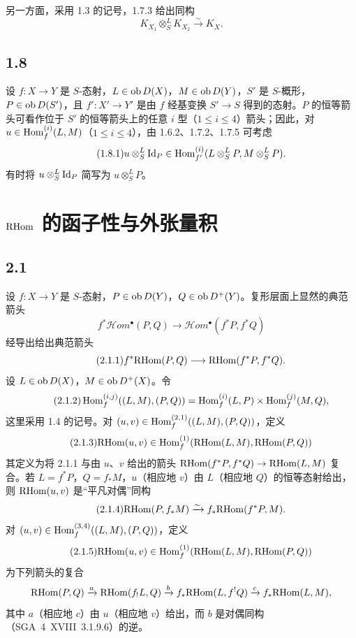 另一方面，采用 1.3 的记号，1.7.3 给出同构
\begin{equation}\tag{1.7.6}
K_{X_1}\otimes^L_SK_{X_2}\xrightarrow{\sim}K_X.
\end{equation}

\subsection*{1.8}
设 $f:X\to Y$ 是 $S$-态射，$L\in\operatorname{ob} D(X)$，$M\in\operatorname{ob} D(Y)$，$S'$ 是 $S$-概形，$P\in\operatorname{ob} D(S')$，且 $f':X'\to Y'$ 是由 $f$ 经基变换 $S'\to S$ 得到的态射。$P$ 的恒等箭头可看作位于 $S'$ 的恒等箭头上的任意 $i$ 型（$1\leq i\leq4$）箭头；因此，对 $u\in\operatorname{Hom}_f^{(i)}(L,M)$（$1\leq i\leq4$），由 1.6.2、1.7.2、1.7.5 可考虑
\begin{equation}\tag{1.8.1}
u\otimes^L_S\mathrm{Id}_P\in\operatorname{Hom}_{f'}^{(i)}(L\otimes^L_SP,M\otimes^L_SP).
\end{equation}
有时将 $u\otimes^L_S\mathrm{Id}_P$ 简写为 $u\otimes^L_SP$。

\section{\texorpdfstring{$\mathrm{RHom}$}{RHom} 的函子性与外张量积}

\subsection*{2.1}
设 $f:X\to Y$ 是 $S$-态射，$P\in\operatorname{ob} D(Y)$，$Q\in\operatorname{ob} D^{+}(Y)$。复形层面上显然的典范箭头
\[
f^{*}\mathcal Hom^{\bullet}(P,Q)\longrightarrow\mathcal Hom^{\bullet}(f^{*}P,f^{*}Q)
\]
经导出给出典范箭头
\begin{equation}\tag{2.1.1}
f^{*}\mathrm{RHom}(P,Q)\longrightarrow\mathrm{RHom}(f^{*}P,f^{*}Q).
\end{equation}
设 $L\in\operatorname{ob} D(X)$，$M\in\operatorname{ob} D^{+}(X)$。令
\begin{equation}\tag{2.1.2}
\operatorname{Hom}_f^{(i,j)}((L,M),(P,Q))=\operatorname{Hom}_f^{(i)}(L,P)\times\operatorname{Hom}_f^{(j)}(M,Q),
\end{equation}
这里采用 1.4 的记号。对 $(u,v)\in\operatorname{Hom}_f^{(2,1)}((L,M),(P,Q))$，定义
\begin{equation}\tag{2.1.3}
\mathrm{RHom}(u,v)\in\operatorname{Hom}_f^{(1)}(\mathrm{RHom}(L,M),\mathrm{RHom}(P,Q))
\end{equation}
其定义为将 2.1.1 与由 $u$、$v$ 给出的箭头 $\mathrm{RHom}(f^{*}P,f^{*}Q)\to\mathrm{RHom}(L,M)$ 复合。若 $L=f^{*}P$，$Q=f_{*}M$，$u$（相应地 $v$）由 $L$（相应地 $Q$）的恒等态射给出，则 $\mathrm{RHom}(u,v)$ 是“平凡对偶”同构
\begin{equation}\tag{2.1.4}
\mathrm{RHom}(P,f_{*}M)\xrightarrow{\sim}f_{*}\mathrm{RHom}(f^{*}P,M).
\end{equation}
对 $(u,v)\in\operatorname{Hom}_f^{(3,4)}((L,M),(P,Q))$，定义
\begin{equation}\tag{2.1.5}
\mathrm{RHom}(u,v)\in\operatorname{Hom}_f^{(1)}(\mathrm{RHom}(L,M),\mathrm{RHom}(P,Q))
\end{equation}
为下列箭头的复合
\[
\mathrm{RHom}(P,Q)\xrightarrow{a}\mathrm{RHom}(f_{!}L,Q)\xrightarrow{b}f_{*}\mathrm{RHom}(L,f^{!}Q)\xrightarrow{c}f_{*}\mathrm{RHom}(L,M),
\]
其中 $a$（相应地 $c$）由 $u$（相应地 $v$）给出，而 $b$ 是对偶同构（SGA~4~XVIII~3.1.9.6）的逆。

